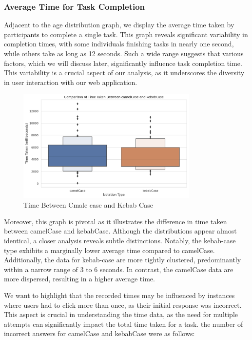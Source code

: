 \documentclass{article}
\begin{document}
\subsubsection*{Average Time for Task Completion}
Adjacent to the age distribution graph, we display the average time taken by participants to complete a single task. This graph reveals significant variability in completion times, with some individuals finishing tasks in nearly one second, while others take as long as 12 seconds. Such a wide range suggests that various factors, which we will discuss later, significantly influence task completion time. This variability is a crucial aspect of our analysis, as it underscores the diversity in user interaction with our web application.

\begin{figure}[H]
    \centering
    \includegraphics[width=0.8\textwidth]{difference_type.png}
    \caption{Time Between Cmale case and Kebab Case}
\end{figure}

Moreover, this graph is pivotal as it illustrates the difference in time taken between camelCase and kebabCase. Although the distributions appear almost identical, a closer analysis reveals subtle distinctions. Notably, the kebab-case type exhibits a marginally lower average time compared to camelCase. Additionally, the data for kebab-case are more tightly clustered, predominantly within a narrow range of 3 to 6 seconds. In contrast, the camelCase data are more dispersed, resulting in a higher average time.

We want to highlight that the recorded times may be influenced by instances where users had to click more than once, as their initial response was incorrect. This aspect is crucial in understanding the time data, as the need for multiple attempts can significantly impact the total time taken for a task. the number of incorrect answers for camelCase and kebabCase were as follows:
\end{document}
